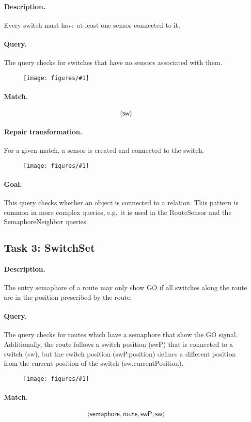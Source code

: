 \documentclass[submission,copyright,creativecommons]{eptcs}
\newcommand{\ttcpattern}[1]{
\begin{figure}[H] 
	\centering
	\texttt{[image: figures/\#1]}
\end{figure}}
\begin{document}
\paragraph{Description.} Every switch must have at least one sensor connected to it. 
\paragraph{Query.} The query checks for switches that have no sensors associated with them.
\ttcpattern{pattern-switchsensor}
\paragraph{Match.} $$\langle \mathsf{sw} \rangle$$
\paragraph{Repair transformation.} For a given match, a \textsf{sensor} is created and connected to the \textsf{switch}.
\ttcpattern{transformation-switchsensor}
\paragraph{Goal.} This query checks whether an object is connected to a relation. This pattern is common in more complex queries, e.g.\ it is used in the \textsf{RouteSensor} and the \textsf{SemaphoreNeighbor} queries.

\subsection{Task 3: SwitchSet}
\label{switchset}
\paragraph{Description.} The entry semaphore of a route may only show GO if all switches along the route are in the position prescribed by the route.
\paragraph{Query.} The query checks for routes which have a semaphore that show the GO signal. Additionally, the route follows a switch position (\textsf{swP}) that is connected to a switch (\textsf{sw}), but the switch position (\textsf{swP.position}) defines a different position from the current position of the switch (\textsf{sw.currentPosition}). 
\ttcpattern{pattern-switchset}
\paragraph{Match.} $$\langle \mathsf{semaphore}, \mathsf{route}, \mathsf{swP}, \mathsf{sw} \rangle$$
\end{document}
